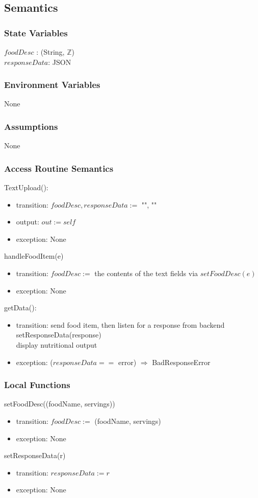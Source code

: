\documentclass[12pt, titlepage]{article}
\begin{document}
\subsection{Semantics}
\subsubsection{State Variables}
$foodDesc$ : (String, $\mathbb{Z}$)\\
$responseData$: JSON
\subsubsection{Environment Variables}
None
\subsubsection{Assumptions}
None
\subsubsection{Access Routine Semantics}
\noindent TextUpload():
\begin{itemize}
	\item transition: $foodDesc, responseData := $ "", ""
	\item output: $out := self$ 
	\item exception: None
\end{itemize}
\noindent handleFoodItem(e)
\begin{itemize}
	\item transition: $foodDesc :=$ the contents of the text fields via 
	$setFoodDesc(e)$
	\item exception: None
\end{itemize}
\noindent getData():
\begin{itemize}
	\item transition: send food item, then listen for a response from 
	backend\\ setResponseData(response) \\ display nutritional output
	\item exception: ($responseData ==$ error) $\Rightarrow$ BadResponseError
\end{itemize}
\subsubsection{Local Functions}
\noindent setFoodDesc((foodName, servings))
\begin{itemize}
	\item transition: $ foodDesc := $ (foodName, servings)
	\item exception: None
\end{itemize}
\noindent setResponseData(r)
\begin{itemize}
	\item transition: $ responseData:=r $
	\item exception: None
\end{itemize}
\end{document}

